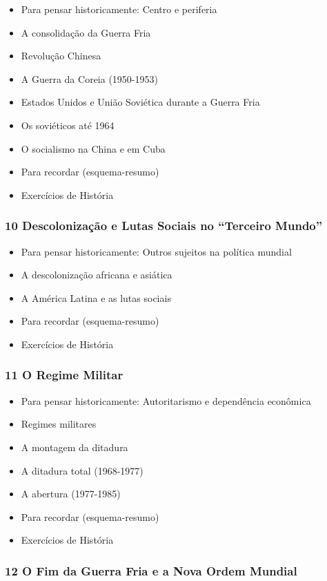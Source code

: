 \documentclass[a4paper,12pt]{article}[abntex2]
\begin{document}
\begin{itemize}
\item Para pensar historicamente: Centro e periferia
\item A consolidação da Guerra Fria
\item Revolução Chinesa
\item A Guerra da Coreia (1950-1953)
\item Estados Unidos e União Soviética durante a Guerra Fria
\item Os soviéticos até 1964
\item O socialismo na China e em Cuba
\item Para recordar (esquema-resumo)
\item Exercícios de História
\end{itemize}
\subsubsection*{10 Descolonização e Lutas Sociais no “Terceiro Mundo”}

\begin{itemize}
\item Para pensar historicamente: Outros sujeitos na política mundial
\item A descolonização africana e asiática
\item A América Latina e as lutas sociais
\item Para recordar (esquema-resumo)
\item Exercícios de História
\end{itemize}
\subsubsection*{11 O Regime Militar}

\begin{itemize}
\item Para pensar historicamente: Autoritarismo e dependência econômica
\item Regimes militares
\item A montagem da ditadura
\item A ditadura total (1968-1977)
\item A abertura (1977-1985)
\item Para recordar (esquema-resumo)
\item Exercícios de História
\end{itemize}
\subsubsection*{12 O Fim da Guerra Fria e a Nova Ordem Mundial}
\end{document}
